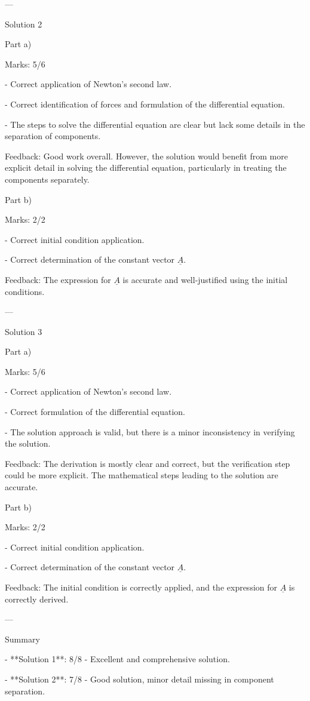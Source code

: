 \documentclass[a4paper,11pt]{article}
\begin{document}
---

Solution 2

Part a)

Marks: 5/6

- Correct application of Newton's second law.

- Correct identification of forces and formulation of the differential equation.

- The steps to solve the differential equation are clear but lack some details in the separation of components.

Feedback: Good work overall. However, the solution would benefit from more explicit detail in solving the differential equation, particularly in treating the components separately.

Part b)

Marks: 2/2

- Correct initial condition application.

- Correct determination of the constant vector \( \underline{A} \).

Feedback: The expression for \( \underline{A} \) is accurate and well-justified using the initial conditions.

---

Solution 3

Part a)

Marks: 5/6

- Correct application of Newton's second law.

- Correct formulation of the differential equation.

- The solution approach is valid, but there is a minor inconsistency in verifying the solution.

Feedback: The derivation is mostly clear and correct, but the verification step could be more explicit. The mathematical steps leading to the solution are accurate.

Part b)

Marks: 2/2

- Correct initial condition application.

- Correct determination of the constant vector \( \underline{A} \).

Feedback: The initial condition is correctly applied, and the expression for \( \underline{A} \) is correctly derived.

---

Summary

- **Solution 1**: 8/8 - Excellent and comprehensive solution.

- **Solution 2**: 7/8 - Good solution, minor detail missing in component separation.
\end{document}
